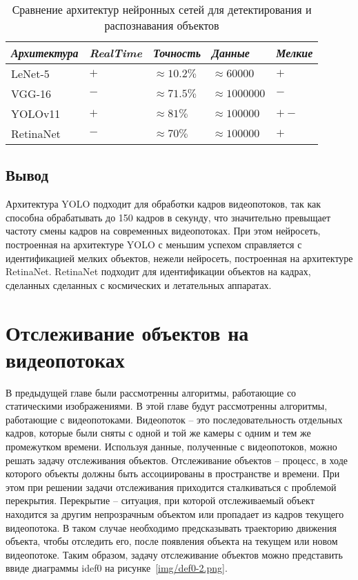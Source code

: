 \begin{table}[h!]
\centering
\caption{Сравнение архитектур нейронных сетей для детектирования и распознавания объектов}
\label{tab:comparison}
\begin{tabular}{|l|l|l|l|l|}
\hline
\textit{Архитектура} & \textit{RealTime} & \textit{Точность} & \textit{Данные} & \textit{Мелкие}\\ \hline
LeNet-5             & $+$ & $\approx10.2\%$ & $\approx60000$ & $+$\\ \hline
VGG-16              & $-$ & $\approx71.5\%$ & $\approx1000000$ & $-$\\ \hline
YOLOv11                & $+$ & $\approx81\%$ &  $\approx100000$ & $+-$\\ \hline
RetinaNet           & $-$ & $\approx70\%$ & $\approx100000$ & $+$\\ \hline
\end{tabular}
\end{table}

\section{Вывод}
Архитектура YOLO подходит для обработки кадров видеопотоков, так как способна обрабатывать до 150 кадров в секунду, что значительно превыщает частоту смены кадров на современных видеопотоках. При этом нейросеть, построенная на архитектуре YOLO с меньшим успехом справляется с идентификацией мелких объектов, нежели нейросеть, построенная на архитектуре RetinaNet. RetinaNet подходит для идентификации объектов на кадрах, сделанных сделанных с космических и летательных аппаратах.

\chapter{Отслеживание объектов на видеопотоках}
В предыдущей главе были рассмотренны алгоритмы, работающие со статическими изображениями. В этой главе будут рассмотренны алгоритмы, работающие с видеопотоками. Видеопоток -- это последовательность отдельных кадров, которые были сняты с одной и той же камеры с одним и тем же промежутком времени. Используя данные, полученные с видеопотоков, можно решать задачу отслеживания объектов. Отслеживание объектов -- процесс, в ходе которого объекты должны быть ассоциированы в пространстве и времени. При этом при решении задачи отслеживания приходится сталкиваться с проблемой перекрытия. Перекрытие -- ситуация, при которой отслеживаемый объект находится за другим непрозрачным объектом или пропадает из кадров текущего видеопотока. В таком случае необходимо предсказывать траекторию движения объекта, чтобы отследить его, после появления объекта на текущем или новом видеопотоке. Таким образом, задачу отслеживание объектов можно представить ввиде диаграммы idef0 на рисунке~\ref{img/def0-2.png}.

